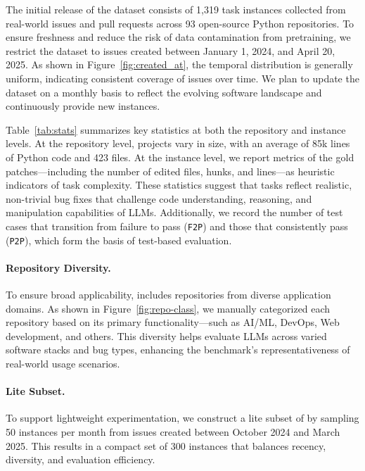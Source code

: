 The initial release of the \benchmark dataset consists of 1,319 task instances collected from real-world issues and pull requests across 93 open-source Python repositories. To ensure freshness and reduce the risk of data contamination from pretraining, we restrict the dataset to issues created between January 1, 2024, and April 20, 2025. As shown in Figure~\ref{fig:created_at}, the temporal distribution is generally uniform, indicating consistent coverage of issues over time. We plan to update the dataset on a monthly basis to reflect the evolving software landscape and continuously provide new  instances.

Table~\ref{tab:stats} summarizes key statistics at both the repository and instance levels. At the repository level, projects vary in size, with an average of 85k lines of Python code and 423 files. At the instance level, we report metrics of the gold patches—including the number of edited files, hunks, and lines—as heuristic indicators of task complexity. These statistics suggest that \benchmark tasks reflect realistic, non-trivial bug fixes that challenge code understanding, reasoning, and manipulation capabilities of LLMs. Additionally, we record the number of test cases that transition from failure to pass (\texttt{F2P}) and those that consistently pass (\texttt{P2P}), which form the basis of test-based evaluation.

\paragraph{Repository Diversity.}  
To ensure broad applicability, \benchmark includes repositories from diverse application domains. As shown in Figure~\ref{fig:repo-class}, we manually categorized each repository based on its primary functionality—such as AI/ML, DevOps, Web development, and others. This diversity helps evaluate LLMs across varied software stacks and bug types, enhancing the benchmark’s representativeness of real-world usage scenarios.

\paragraph{Lite Subset.}  
To support lightweight experimentation, we construct a lite subset of \benchmark by sampling 50 instances per month from issues created between October 2024 and March 2025. This results in a compact set of 300 instances that balances recency, diversity, and evaluation efficiency.


